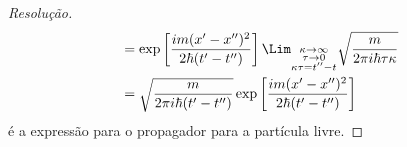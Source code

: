 \begin{proof}[Resolução]
\begin{align*}
                         &= \exp\left[\frac{i m (x' - x'')^2}{2 \hbar (t' - t'')}\right] \Lim_{\substack{\kappa \to \infty\\ \tau \to 0\\ \kappa \tau = t'' - t}}{\sqrt{\frac{m}{2\pi i \hbar \tau \kappa}}}\\
                         &= \sqrt{\frac{m}{2\pi i \hbar (t' - t'')}}\exp\left[\frac{i m (x' - x'')^2}{2 \hbar (t' - t'')}\right]
      \end{align*}
      é a expressão para o propagador para a partícula livre.
   \end{proof}

